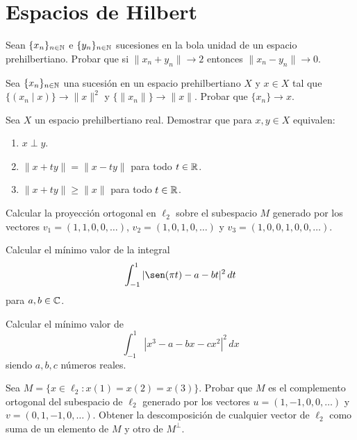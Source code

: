 \section{Espacios de Hilbert}

\begin{ejercicio}
Sean $\{x_n\}_{n \in \mathbb{N}}$ e $\{y_n\}_{n \in \mathbb{N}}$ sucesiones en la bola unidad de un espacio prehilbertiano. Probar que si $\|x_n + y_n\| \longrightarrow 2$ entonces $\|x_n - y_n\| \longrightarrow 0$.
\end{ejercicio}

\begin{ejercicio}
Sea $\{x_n\}_{n \in \mathbb{N}}$ una sucesión en un espacio prehilbertiano $X$ y $x \in X$ tal que $\{(x_n \mid x)\} \longrightarrow \|x\|^2$ y $\{\|x_n\|\} \longrightarrow \|x\|$. Probar que $\{x_n\} \longrightarrow x$.
\end{ejercicio}

\begin{ejercicio}
Sea $X$ un espacio prehilbertiano real. Demostrar que para $x, y \in X$ equivalen:
\begin{enumerate}[label=\textbf{\alph*)}]
    \item $x \perp y$.
    \item $\|x + ty\| = \|x - ty\|$ para todo $t \in \mathbb{R}$.
    \item $\|x + ty\| \geq \|x\|$ para todo $t \in \mathbb{R}$.
\end{enumerate}
\end{ejercicio}

\begin{ejercicio}
Calcular la proyección ortogonal en $\ell_2$ sobre el subespacio $M$ generado por los vectores $v_1 = (1, 1, 0, 0, \dots)$, $v_2 = (1, 0, 1, 0, \dots)$ y $v_3 = (1, 0, 0, 1, 0, 0, \dots)$.
\end{ejercicio}

\begin{ejercicio}
Calcular el mínimo valor de la integral
\[
\int_{-1}^1 |\sen(\pi t) - a - bt|^2\,dt
\]
para $a, b \in \mathbb{C}$.
\end{ejercicio}

\begin{ejercicio}
Calcular el mínimo valor de
\[
\int_{-1}^1 |x^3 - a - bx - cx^2|^2\,dx
\]
siendo $a, b, c$ números reales.
\end{ejercicio}

\begin{ejercicio}
Sea $M = \{x \in \ell_2 : x(1) = x(2) = x(3)\}$. Probar que $M$ es el complemento ortogonal del subespacio de $\ell_2$ generado por los vectores $u = (1, -1, 0, 0, \dots)$ y $v = (0, 1, -1, 0, \dots)$. Obtener la descomposición de cualquier vector de $\ell_2$ como suma de un elemento de $M$ y otro de $M^\perp$.
\end{ejercicio}